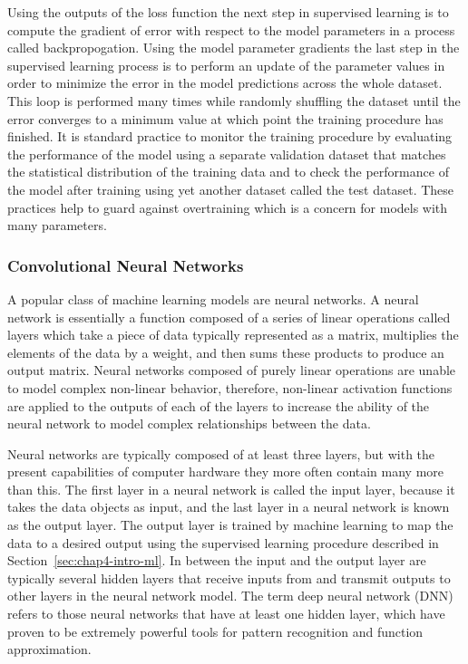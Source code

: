 Using the outputs of the loss function the next step in supervised learning is to compute the gradient of error with respect to the model parameters in a process called backpropogation. Using the model parameter gradients the last step in the supervised learning process is to perform an update of the parameter values in order to minimize the error in the model predictions across the whole dataset. This loop is performed many times while randomly shuffling the dataset until the error converges to a minimum value at which point the training procedure has finished. It is standard practice to monitor the training procedure by evaluating the performance of the model using a separate validation dataset that matches the statistical distribution of the training data and to check the performance of the model after training using yet another dataset called the test dataset. These practices help to guard against overtraining which is a concern for models with many parameters.

\subsubsection*{Convolutional Neural Networks}

A popular class of machine learning models are neural networks. A neural network is essentially a function composed of a series of linear operations called layers which take a piece of data typically represented as a matrix, multiplies the elements of the data by a weight, and then sums these products to produce an output matrix. Neural networks composed of purely linear operations are unable to model complex non-linear behavior, therefore, non-linear activation functions are applied to the outputs of each of the layers to increase the ability of the neural network to model complex relationships between the data. 

Neural networks are typically composed of at least three layers, but with the present capabilities of computer hardware they more often contain many more than this. The first layer in a neural network is called the input layer, because it takes the data objects as input, and the last layer in a neural network is known as the output layer. The output layer is trained by machine learning to map the data to a desired output using the supervised learning procedure described in Section~\ref{sec:chap4-intro-ml}. In between the input and the output layer are typically several hidden layers that receive inputs from and transmit outputs to other layers in the neural network model. The term deep neural network (DNN) refers to those neural networks that have at least one hidden layer, which have proven to be extremely powerful tools for pattern recognition and function approximation.


